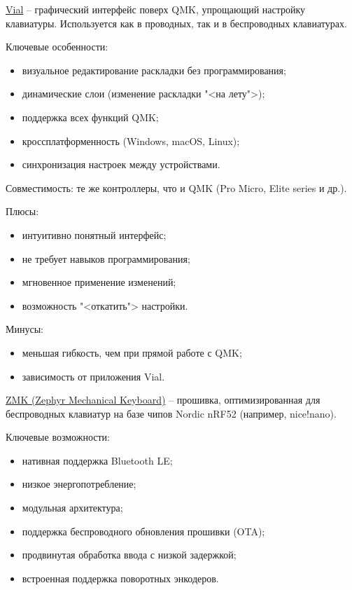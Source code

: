 \underline{Vial} -- графический интерфейс поверх QMK, упрощающий настройку клавиатуры. Используется как в проводных, так и в беспроводных клавиатурах.

Ключевые особенности:

\begin{itemize}
\item визуальное редактирование раскладки без программирования;
\item динамические слои (изменение раскладки "<на лету">);
\item поддержка всех функций QMK;
\item кроссплатформенность (Windows, macOS, Linux);
\item синхронизация настроек между устройствами.
\end{itemize}

Совместимость: те же контроллеры, что и QMK (Pro Micro, Elite series и др.).

Плюсы:

\begin{itemize}
\item интуитивно понятный интерфейс;
\item не требует навыков программирования;
\item мгновенное применение изменений;
\item возможность "<откатить"> настройки.
\end{itemize}

Минусы:

\begin{itemize}
\item меньшая гибкость, чем при прямой работе с QMK;
\item зависимость от приложения Vial. 
\end{itemize}

\underline{ZMK (Zephyr Mechanical Keyboard)} -- прошивка, оптимизированная для беспроводных клавиатур на базе чипов Nordic nRF52 (например, nice!nano).

Ключевые возможности:

\begin{itemize}
\item нативная поддержка Bluetooth LE;
\item низкое энергопотребление;
\item модульная архитектура;
\item поддержка беспроводного обновления прошивки (OTA);
\item продвинутая обработка ввода с низкой задержкой;
\item встроенная поддержка поворотных энкодеров.
\end{itemize}

